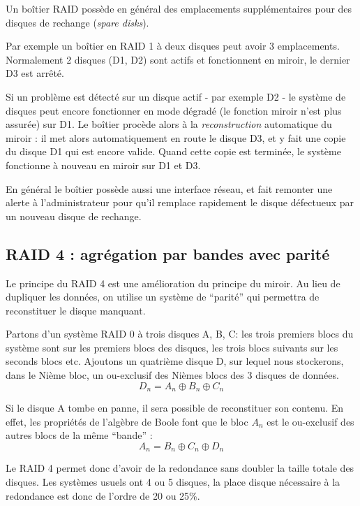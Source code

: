 \begin{multicols}{2}
Un boîtier RAID possède en général des emplacements supplémentaires 
pour des disques de rechange (\emph{spare disks}).

Par exemple un boîtier en RAID 1 à deux disques peut avoir 3
emplacements.  Normalement 2 disques (D1, D2) sont actifs et
fonctionnent en miroir, le dernier D3 est arrêté.

Si un problème est détecté sur un disque actif - par exemple D2 - le
système de disques peut encore fonctionner en mode dégradé (le
fonction miroir n'est plus assurée) sur D1. Le boîtier procède alors 
à la \emph{reconstruction} automatique du miroir : il met alors
automatiquement en route le disque D3, et y fait une copie du disque
D1 qui est encore valide. Quand cette copie est terminée, le système
fonctionne à nouveau en miroir sur D1 et D3.

En général le boîtier possède aussi une interface réseau, et fait
remonter une alerte à l'administrateur pour qu'il remplace rapidement
 le disque défectueux par un nouveau disque de rechange.


\subsection{RAID 4 : agrégation par bandes avec parité}

Le principe du RAID 4 est une amélioration du principe du miroir.
Au lieu de dupliquer les données, on utilise un système de ``parité''
qui permettra de reconstituer le disque manquant.

Partons d'un système RAID 0 à trois disques A, B, C: les trois premiers blocs
du système sont sur les premiers blocs des disques, les trois blocs
suivants sur les seconds blocs etc.  Ajoutons un quatrième disque D, sur
lequel nous stockerons, dans le Nième bloc, un ou-exclusif des Nièmes
blocs des 3 disques de données.
$$ D_n = A_n \oplus B_n \oplus  C_n $$


Si le disque A tombe en panne, il sera possible de reconstituer
son contenu. En effet, les propriétés de l'algèbre de Boole font que 
le bloc $A_n$ est le ou-exclusif des autres blocs de la 
même ``bande'' :
$$ A_n = B_n \oplus  C_n \oplus D_n $$

Le RAID 4 permet donc d'avoir de la redondance sans doubler la taille
totale des disques.  Les systèmes usuels ont 4 ou 5 disques, la place
disque nécessaire à la redondance est donc de l'ordre de 20 ou 25\%.


\end{multicols}
